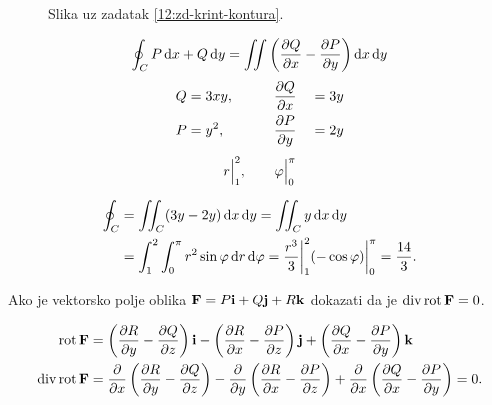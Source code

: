 \begin{center}
	\begin{minipage}[t]{0.48\textwidth}
		\begin{figure}[H]
			\centering
			\caption{Slika uz zadatak \ref{12:zd-krint-kontura}.}
			\label{12:slika-krint-kontura}
		\end{figure}
	\end{minipage}
	\begin{minipage}[t]{0.48\textwidth}
		\[
			\oint_C P\dd{x} + Q\dd{y} = \iint \left( \pdv{Q}{x} - \pdv{P}{y}  \right) \dd{x} \dd{y}
		\]
		\begin{alignat*}{3}
			Q & = 3xy, \qquad &  & \pdv{Q}{{x}} &  & = 3y \\
			P & = y^2, \qquad &  & \pdv{P}{{y}} &  & = 2y
		\end{alignat*}
		\[
			r\Big|_1^{2}, \qquad \varphi\Big|_0^{\pi}
		\]
	\end{minipage}
\end{center}

\begin{alignat*}{1}
	\oint_C & = \iint_C (3y-2y) \dd{x} \dd{y} = \iint_C y \dd{x} \dd{y} \\
	        & = \int_{1}^{2} \int_{0}^{\pi} r^2 \sin\varphi \dd{r} \dd{\varphi}
	= \frac{r^3}{3} \bigg|_1^{2} (- \cos \varphi) \bigg|_0^{\pi} = \frac{14}{3}
	.\end{alignat*}

\begin{zadatak}
	Ako je vektorsko polje oblika $\vb{F} = P \vb{i} + Q \vb{j} + R \vb{k}$ dokazati da je $\operatorname{div} \operatorname{rot} \vb{F} = 0$.
\end{zadatak}
\begin{alignat*}{1}
	\operatorname{rot} \vb{F}       & =	\left( \pdv{R}{y} - \pdv{Q}{z}  \right) \vb{i} -
	\left( \pdv{R}{x} - \pdv{P}{z}  \right) \vb{j} +
	\left( \pdv{Q}{x} - \pdv{P}{y}  \right) \vb{k}                            \\
	\operatorname{div} \operatorname{rot} \vb{F} & =	\pdv{}{x} \left( \pdv{R}{y} - \pdv{Q}{z} \right) -
	\pdv{}{y} \left( \pdv{R}{x} - \pdv{P}{z} \right) +
	\pdv{}{x} \left( \pdv{Q}{x} - \pdv{P}{y} \right) = 0
	.\end{alignat*}

